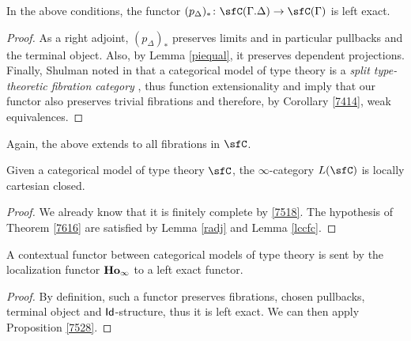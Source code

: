 \begin{lem}\label{lccfc}
  In the above conditions, the functor
  $(p_\Delta)_*\colon\sfC(\Gamma.\Delta)\rightarrow\sfC(\Gamma)$ is left exact.
\end{lem}
\begin{proof}
  As a right adjoint, $(p_\Delta)_*$ preserves limits and in particular
  pullbacks and the terminal object. Also, by Lemma \ref{piequal}, it preserves
  dependent projections. Finally, Shulman noted in \cite[21]{Shu14} that a
  categorical model of type theory is a \emph{split type-theoretic fibration
  category} \cite[Def.~4.1]{Shu14}, thus function extensionality and
  \cite[Thm.~5.9]{Shu14} imply that our functor also preserves trivial
  fibrations and therefore, by Corollary \ref{7414}, weak equivalences.
\end{proof}

Again, the above extends to all fibrations in $\sfC$.

\begin{thm}\label{finalthm}
  Given a categorical model of type theory $\sfC$, the $\infty$-category $L(\sfC)$
  is locally cartesian closed.
\end{thm}
\begin{proof}
  We already know that it is finitely complete by \ref{7518}. The hypothesis of
  Theorem \ref{7616} are satisfied by Lemma \ref{radj} and Lemma \ref{lccfc}.
\end{proof}

\begin{thm}
  A contextual functor between categorical models of type theory is sent by the
  localization functor $\operatorname{\mathbf{Ho}_\infty}$ to a left exact functor.
\end{thm}
\begin{proof}
  By definition, such a functor preserves fibrations, chosen pullbacks, terminal
  object and $\operatorname{\mathsf{Id}}$-structure, thus it is left exact. We can then apply
  Proposition \ref{7528}.
\end{proof}
